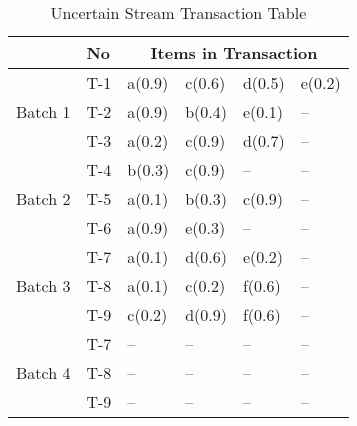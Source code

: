 \documentclass{article}
\begin{document}
\begin{table}
\centering

\begin{tabular}{|l|l|l|l|l|l|}
\hline
	& No & \multicolumn{4}{c|}{Items in Transaction} \\ \hline \hline
	\multirow{3}{*}{Batch 1}	&	T-1 & a(0.9) & c(0.6) & d(0.5) & e(0.2)\\\cline{2-6}
								&	T-2 & a(0.9) & b(0.4) & e(0.1) & --    \\\cline{2-6}
								&	T-3 & a(0.2) & c(0.9) & d(0.7) & --    \\\hline
	\multirow{3}{*}{Batch 2}			&	T-4 & b(0.3) & c(0.9) & -- & --\\\cline{2-6}
								&	T-5 & a(0.1) & b(0.3) & c(0.9) & --    \\\cline{2-6}
								&	T-6 & a(0.9) & e(0.3) & -- & --        \\\hline
	\multirow{3}{*}{Batch 3}			&	T-7 & a(0.1) & d(0.6) & e(0.2) & --    \\\cline{2-6}
								&	T-8 & a(0.1) & c(0.2) & f(0.6) & --    \\\cline{2-6}
								&	T-9 & c(0.2) & d(0.9) & f(0.6) & --    \\\hline

	\multirow{3}{*}{Batch 4}	&	T-7 &  --  &  --  &  --  & --    \\\cline{2-6}
								&	T-8 &  --  &  --  &  --  & --    \\\cline{2-6}
								&	T-9 &  --  &  --  &  --  & --    \\\hline
	\end{tabular}
\caption{Uncertain Stream Transaction Table}
\end{table}
\end{document}
